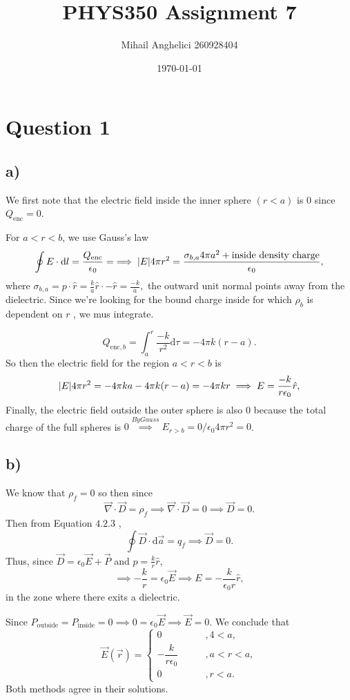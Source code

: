 \documentclass[12pt]{article}
\title{PHYS350 Assignment 7}
\author{Mihail Anghelici 260928404 }
\date{\today}
\newcommand{\ep}{\epsilon}
\newcommand{\dr}{\mathrm{d}}
\theoremstyle{definition}
\theoremstyle{definition}
\theoremstyle{definition}
\theoremstyle{definition}
\theoremstyle{definition}
\theoremstyle{example}
\theoremstyle{note}
\theoremstyle{remark}
\theoremstyle{example}
\begin{document}
	\maketitle
		\section*{Question 1}
		\subsection*{a)} 
			We first note that the electric field inside the inner sphere $(r < a)$ is $0$ since $Q_{\text{enc}} = 0$.
			
			\noindent For $a<r<b$, we use Gauss's law
			$$\oint E \cdot \dr l = \frac{Q_{\text{enc}}}{\ep_{0}} =\implies \abs{E} 4 \pi r^{2} = \frac{ \sigma_{b,a} 4 \pi a^{2} + \text{inside density charge}}{\ep_{0}} ,$$
			where $\sigma_{b,a} = p\cdot \hat{r}  = \frac{k}{a}\hat{r} \cdot -\hat{r} = \frac{-k}{a}, $ the outward unit normal points away from the dielectric.
			Since we're looking for the bound charge inside for which $\rho_b$ is dependent on $r$ , we mus integrate.
			
			$$ Q_{\text{enc},b} = \int_{a}^{r} \frac{-k}{r^{2}} \dr \tau = -4 \pi k (r-a). $$
			So then the electric field for the region $a<r<b$ is 
			$$ \abs{E} 4 \pi r^{2} =  -4\pi ka - 4\pi k(r-a) = -4 \pi kr  \implies E = \frac{-k}{r \ep_{0}}\hat{r} ,$$
			Finally, the electric field outside the outer sphere is also $0$ because the total charge of the full spheres is $0 \overset{By Gauss}{\implies} E_{r>b} = 0 / \ep_{0} 4 \pi r^{2}=0$.
			
		\subsection*{b) }
			We know that $\rho_{f} =0$ so then since 
			$$ \vec{\nabla} \cdot \vec{D} = \rho_{f} \implies \vec{\nabla } \cdot \vec{D} = 0 \implies \vec{D} =0.$$
			Then from Equation $4.2.3$ , 
			$$ \oint \vec{D} \cdot \dr \vec{a} = q_{f} \implies \vec{D} =0 . $$
			Thus, since $ \vec{D} = \ep_{0} \vec{E} + \vec{P} $ and $p = \frac{k}{r} \hat{r}$, 
			$$ \implies -\frac{k}{r} = \ep_{0} \vec{E} \implies E = - \frac{k}{\ep_{0}r}\hat{r},$$ 
			in the zone where there exits a dielectric. 
			
			\noindent Since $P_{\text{outside}} = P_{\text{inside}} = 0 \implies 0 = \ep_{0} \vec{E} \implies \vec{E} =0.$ We conclude that 
			$$ \vec{E} (\vec{r}) = \begin{cases}
				0 \qquad &, 4 <a, \\
				-\dfrac{k}{r \ep_{0}} \qquad &, a <r <a ,\\
				0 \qquad  &, r <a.
			\end{cases}$$ 
			Both methods agree in their solutions.
			
\end{document}
